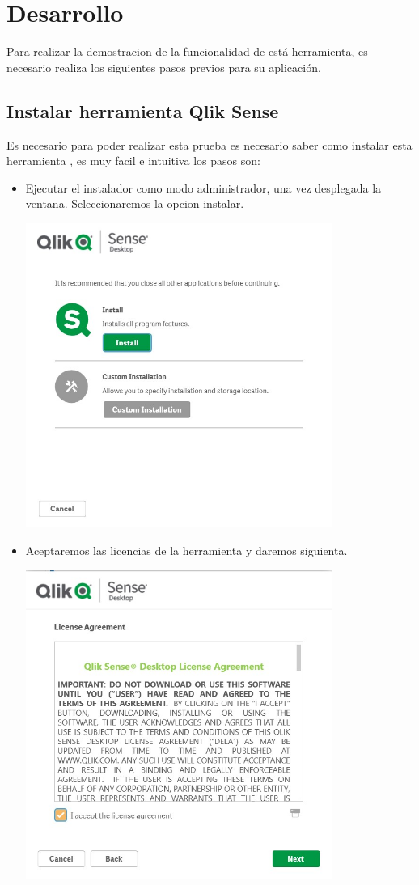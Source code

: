  \section{Desarrollo} 

Para realizar la demostracion de la funcionalidad de está herramienta,  es necesario realiza los siguientes pasos previos para su aplicación.
\subsection{Instalar herramienta Qlik Sense}

Es necesario para poder realizar esta prueba es necesario saber como instalar esta herramienta , es muy facil e intuitiva los pasos son: 

\begin{itemize}
		\item Ejecutar el instalador como modo administrador, una vez desplegada la ventana. Seleccionaremos la opcion instalar.
\begin{center}
	\includegraphics[width=10cm]{./Imagenes/img1} 
\end{center}
		\item Aceptaremos las licencias de la herramienta y daremos siguienta.
\begin{center}
	\includegraphics[width=10cm]{./Imagenes/img2} 

\end{center}
\end{itemize}
